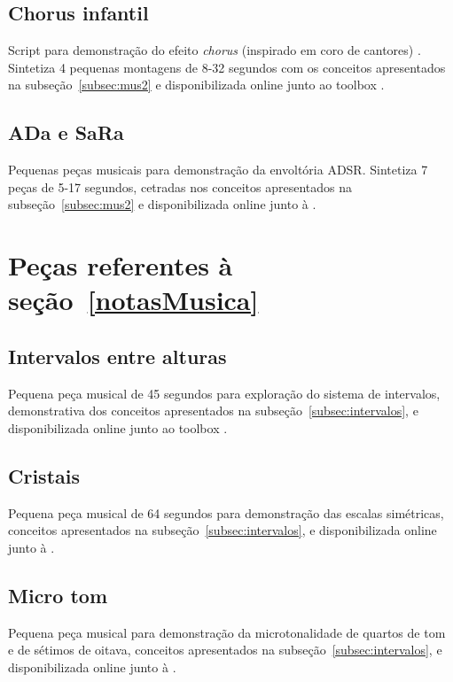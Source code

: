 \clearpage


\subsection{Chorus infantil}\label{ap:chorus}
Script para demonstração do efeito \emph{chorus} (inspirado em coro de cantores) . Sintetiza 4 pequenas montagens de 8-32 segundos com os conceitos apresentados na subseção~\ref{subsec:mus2} e disponibilizada online junto ao toolbox \massa.\cite{MASSA}



\subsection{ADa e SaRa}\label{ap:ada}
Pequenas peças musicais para demonstração da envoltória ADSR. Sintetiza 7 peças de 5-17 segundos, cetradas nos conceitos apresentados na subseção~\ref{subsec:mus2} e disponibilizada online junto à \massa.\cite{MASSA}


\clearpage

\section{Peças referentes à seção~\ref{notasMusica}}
\subsection{Intervalos entre alturas}\label{ap:intervalos}
Pequena peça musical de 45 segundos para exploração do sistema de intervalos, demonstrativa dos conceitos apresentados na subseção~\ref{subsec:intervalos}, e disponibilizada online junto ao toolbox \massa.


\subsection{Cristais}\label{ap:cristais}
Pequena peça musical de 64 segundos para demonstração das escalas simétricas, conceitos apresentados na subseção~\ref{subsec:intervalos}, e disponibilizada online junto à \massa.\cite{MASSA}

\clearpage


\subsection{Micro tom}\label{ap:micro}
Pequena peça musical para demonstração da microtonalidade de quartos de tom e de sétimos de oitava, conceitos apresentados na subseção~\ref{subsec:intervalos}, e disponibilizada online junto à \massa.\cite{MASSA}


